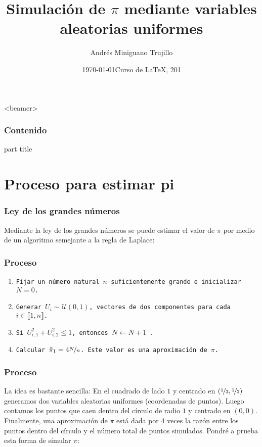\documentclass[11pt,a4paper]{beamer}
\title{Simulación de \(\pi\) mediante variables \\ aleatorias uniformes}
\author{Andr\'{e}s Miniguano Trujillo}
\date{\today}
\date[\today] %
{Curso de \LaTeX, 201}
\newcommand{\llb}{\llbracket}
\newcommand{\rrb}{\rrbracket}
\begin{document}
\begin{frame}  %
\titlepage
\end{frame}

\begin{frame}<beamer> %
\frametitle{Contenido}
\tableofcontents
\end{frame}

\AtBeginSection  %
{
\begin{frame}
\begin{center}
\begin{beamercolorbox}[sep=8pt,center]{part title}
\insertsection
\end{beamercolorbox}
\end{center}
\end{frame} 
}

\section{Proceso para estimar pi {}} 

\begin{frame}
\frametitle{Ley de los grandes números}
Mediante la ley de los grandes números se puede estimar el valor de \(\pi\) por medio de un algoritmo semejante a la regla de Laplace:
\end{frame}

\begin{frame}
\frametitle{Proceso}
    \begin{enumerate}[<+->]
        \item \texttt{Fijar un número natural \(n\) suficientemente grande e inicializar \(N=0\).}
        \item \texttt{Generar \(U_i \sim \mathcal{U}(0,1)\), vectores de dos componentes para cada \(i\in \llb 1,n \rrb \).}
        \item \texttt{Si \( U_{i,1}^2 + U_{i,2}^2 \leq 1 \), entonces \(N \leftarrow N+1\) .}
        \item \texttt{Calcular \( \tilde{\pi}_1 = 4\nicefrac{N}{n} \). Este valor es una aproximación de \(\pi\).}
    \end{enumerate}
\end{frame}

\begin{frame}
\frametitle{Proceso}
La idea es bastante sencilla: En el cuadrado de lado \(1\) y centrado en \( (\nicefrac 1 2, \nicefrac 1 2) \) generamos dos variables aleatorias uniformes (coordenadas de puntos). Luego contamos los puntos que caen dentro del círculo de radio \(1\) y centrado en \((0,0)\). Finalmente, una aproximación de \(\pi\) está dada por \(4\) veces la razón entre los puntos dentro del círculo y el número total de puntos simulados.
Pondré a prueba esta forma de simular \(\pi\):
\end{frame}
\end{document}
